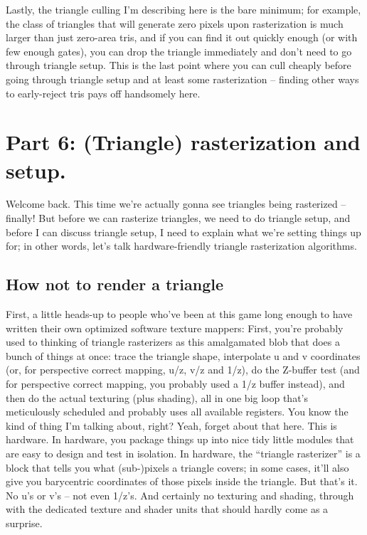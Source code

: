 \documentclass[12pt]{article}
\begin{document}
Lastly, the triangle culling I’m describing here is the bare minimum; for example, the class of triangles that will generate zero pixels upon rasterization is much larger than just zero-area tris, and if you can find it out quickly enough (or with few enough gates), you can drop the triangle immediately and don’t need to go through triangle setup. This is the last point where you can cull cheaply before going through triangle setup and at least some rasterization – finding other ways to early-reject tris pays off handsomely here.

\section{Part 6: (Triangle) rasterization and setup.}
\label{sec:org1b35a47}
\label{part6}

Welcome back. This time we’re actually gonna see triangles being rasterized – finally! But before we can rasterize triangles, we need to do triangle setup, and before I can discuss triangle setup, I need to explain what we’re setting things up for; in other words, let’s talk hardware-friendly triangle rasterization algorithms.

\subsection{How not to render a triangle}
\label{sec:org91273d3}

First, a little heads-up to people who’ve been at this game long enough to have written their own optimized software texture mappers: First, you’re probably used to thinking of triangle rasterizers as this amalgamated blob that does a bunch of things at once: trace the triangle shape, interpolate u and v coordinates (or, for perspective correct mapping, u/z, v/z and 1/z), do the Z-buffer test (and for perspective correct mapping, you probably used a 1/z buffer instead), and then do the actual texturing (plus shading), all in one big loop that’s meticulously scheduled and probably uses all available registers. You know the kind of thing I’m talking about, right? Yeah, forget about that here. This is hardware. In hardware, you package things up into nice tidy little modules that are easy to design and test in isolation. In hardware, the “triangle rasterizer” is a block that tells you what (sub-)pixels a triangle covers; in some cases, it’ll also give you barycentric coordinates of those pixels inside the triangle. But that’s it. No u’s or v’s – not even 1/z’s. And certainly no texturing and shading, through with the dedicated texture and shader units that should hardly come as a surprise.
\end{document}
